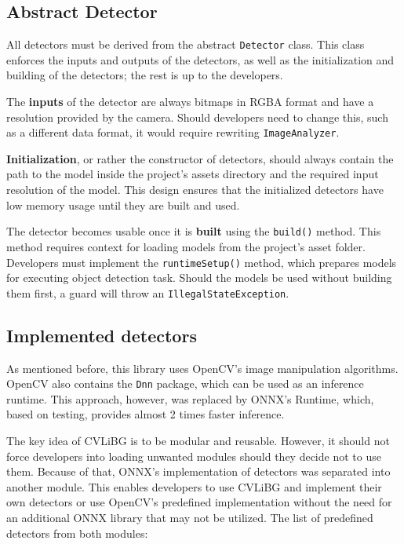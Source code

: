 \subsection{Abstract Detector}
All detectors must be derived from the abstract \texttt{Detector} class. This class enforces the inputs and outputs of the detectors, as well as the initialization and building of the detectors; the rest is up to the developers.

The \textbf{inputs} of the detector are always bitmaps in RGBA format and have a resolution provided by the camera. Should developers need to change this, such as a different data format, it would require rewriting \texttt{ImageAnalyzer}.

\textbf{Initialization}, or rather the constructor of detectors, should always contain the path to the model inside the project's assets directory and the required input resolution of the model. This design ensures that the initialized detectors have low memory usage until they are built and used. 

The detector becomes usable once it is \textbf{built} using the \texttt{build()} method. This method requires context for loading models from the project's asset folder. Developers must implement the \texttt{runtimeSetup()} method, which prepares models for executing object detection task. Should the models be used without building them first, a guard will throw an \texttt{IllegalStateException}. 

\subsection{Implemented detectors}
As mentioned before, this library uses OpenCV's image manipulation algorithms. OpenCV also contains the \texttt{Dnn} package, which can be used as an inference runtime. This approach, however, was replaced by ONNX's Runtime, which, based on testing, provides almost 2 times faster inference. 

The key idea of CVLiBG is to be modular and reusable. However, it should not force developers into loading unwanted modules should they decide not to use them. Because of that, ONNX's implementation of detectors was separated into another module. This enables developers to use CVLiBG and implement their own detectors or use OpenCV's predefined implementation without the need for an additional ONNX library that may not be utilized. The list of predefined detectors from both modules:

